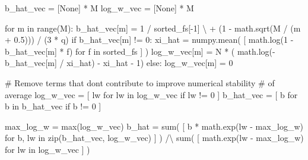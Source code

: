 \documentclass[
  letterpaper,
  DIV=11,
  numbers=noendperiod]{scrartcl}
\newenvironment{Shaded}{\begin{snugshade}}{\end{snugshade}}
\newcommand{\BuiltInTok}[1]{\textcolor[rgb]{0.00,0.23,0.31}{#1}}
\newcommand{\CommentTok}[1]{\textcolor[rgb]{0.37,0.37,0.37}{#1}}
\newcommand{\ControlFlowTok}[1]{\textcolor[rgb]{0.00,0.23,0.31}{#1}}
\newcommand{\DecValTok}[1]{\textcolor[rgb]{0.68,0.00,0.00}{#1}}
\newcommand{\FloatTok}[1]{\textcolor[rgb]{0.68,0.00,0.00}{#1}}
\newcommand{\KeywordTok}[1]{\textcolor[rgb]{0.00,0.23,0.31}{#1}}
\newcommand{\NormalTok}[1]{\textcolor[rgb]{0.00,0.23,0.31}{#1}}
\newcommand{\OperatorTok}[1]{\textcolor[rgb]{0.37,0.37,0.37}{#1}}
\newcommand{\VariableTok}[1]{\textcolor[rgb]{0.07,0.07,0.07}{#1}}
\begin{document}
\begin{Shaded}
\begin{Highlighting}[]
\NormalTok{  b\_hat\_vec }\OperatorTok{=}\NormalTok{ [}\VariableTok{None}\NormalTok{] }\OperatorTok{*}\NormalTok{ M}
\NormalTok{  log\_w\_vec }\OperatorTok{=}\NormalTok{ [}\VariableTok{None}\NormalTok{] }\OperatorTok{*}\NormalTok{ M}
  
  \ControlFlowTok{for}\NormalTok{ m }\KeywordTok{in} \BuiltInTok{range}\NormalTok{(M):}
\NormalTok{    b\_hat\_vec[m] }\OperatorTok{=}   \DecValTok{1} \OperatorTok{/}\NormalTok{ sorted\_fs[}\OperatorTok{{-}}\DecValTok{1}\NormalTok{] }\OperatorTok{\textbackslash{}}
                   \OperatorTok{+}\NormalTok{ (}\DecValTok{1} \OperatorTok{{-}}\NormalTok{ math.sqrt(M }\OperatorTok{/}\NormalTok{ (m }\OperatorTok{+} \FloatTok{0.5}\NormalTok{))) }\OperatorTok{/}\NormalTok{ (}\DecValTok{3} \OperatorTok{*}\NormalTok{ q)}
    \ControlFlowTok{if}\NormalTok{ b\_hat\_vec[m] }\OperatorTok{!=} \DecValTok{0}\NormalTok{:}
\NormalTok{      xi\_hat }\OperatorTok{=}\NormalTok{ numpy.mean( [ math.log(}\DecValTok{1} \OperatorTok{{-}}\NormalTok{ b\_hat\_vec[m] }\OperatorTok{*}\NormalTok{ f) }
                             \ControlFlowTok{for}\NormalTok{ f }\KeywordTok{in}\NormalTok{ sorted\_fs ] )}
\NormalTok{      log\_w\_vec[m] }\OperatorTok{=}\NormalTok{ N }\OperatorTok{*}\NormalTok{ (   math.log(}\OperatorTok{{-}}\NormalTok{b\_hat\_vec[m] }\OperatorTok{/}\NormalTok{ xi\_hat) }
                           \OperatorTok{{-}}\NormalTok{ xi\_hat }\OperatorTok{{-}} \DecValTok{1}\NormalTok{)}
    \ControlFlowTok{else}\NormalTok{:}
\NormalTok{      log\_w\_vec[m] }\OperatorTok{=} \DecValTok{0}

  \CommentTok{\# Remove terms that don\textquotesingle{}t contribute to improve numerical stability }
  \CommentTok{\# of average}
\NormalTok{  log\_w\_vec }\OperatorTok{=}\NormalTok{ [ lw }\ControlFlowTok{for}\NormalTok{ lw }\KeywordTok{in}\NormalTok{ log\_w\_vec }\ControlFlowTok{if}\NormalTok{ lw }\OperatorTok{!=} \DecValTok{0}\NormalTok{ ]}
\NormalTok{  b\_hat\_vec }\OperatorTok{=}\NormalTok{ [ b }\ControlFlowTok{for}\NormalTok{ b }\KeywordTok{in}\NormalTok{ b\_hat\_vec }\ControlFlowTok{if}\NormalTok{ b }\OperatorTok{!=} \DecValTok{0}\NormalTok{ ]}

\NormalTok{  max\_log\_w }\OperatorTok{=} \BuiltInTok{max}\NormalTok{(log\_w\_vec)}
\NormalTok{  b\_hat }\OperatorTok{=} \BuiltInTok{sum}\NormalTok{( [ b }\OperatorTok{*}\NormalTok{ math.exp(lw }\OperatorTok{{-}}\NormalTok{ max\_log\_w) }
               \ControlFlowTok{for}\NormalTok{ b, lw }\KeywordTok{in} \BuiltInTok{zip}\NormalTok{(b\_hat\_vec, log\_w\_vec) ] ) }\OperatorTok{/\textbackslash{}}
          \BuiltInTok{sum}\NormalTok{( [ math.exp(lw }\OperatorTok{{-}}\NormalTok{ max\_log\_w) }\ControlFlowTok{for}\NormalTok{ lw }\KeywordTok{in}\NormalTok{ log\_w\_vec ] )}


\end{Highlighting}
\end{Shaded}
\end{document}
